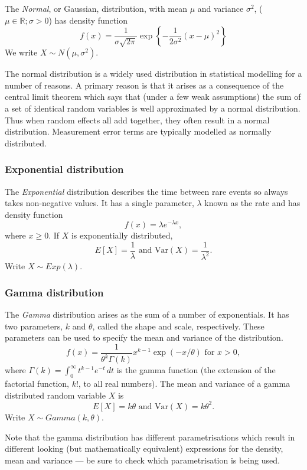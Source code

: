 \documentclass[11pt]{article}
\begin{document}
 
The {\em Normal}, or Gaussian, distribution, with mean $\mu$ and variance $\sigma^2$, ($\mu\in\mathbb{R};\sigma>0$) has density function 
\[
f(x)=\frac{1}{\sigma\sqrt{2\pi}}\exp\left\{-\frac{1}{2\sigma^2}\left(x-\mu\right)^2\right\}
\]
We write  $X \sim N(\mu,\sigma^2)$.

The normal distribution is a widely used distribution in statistical modelling  for  a number of reasons.  A primary reason is that it arises as a consequence of the central limit theorem which says that (under a few weak assumptions) the sum of a set of identical  random variables is well approximated by a normal distribution. Thus when random effects all add together, they often result in a normal distribution.  Measurement error terms are typically modelled as normally distributed.
 
 \subsubsection{Exponential  distribution}

The  {\em Exponential} distribution describes the time between rare events so always takes non-negative values.  It has a single parameter, $\lambda$ known as the rate and has density function \[f(x) = \lambda e^{-\lambda x},\] where $x \geq 0$.
 If $X$ is exponentially distributed, 
 \[ E[X] = \frac 1 \lambda \mbox{ and } \mathrm{Var}(X) = \frac 1 {\lambda^2}. \]
 Write $X \sim Exp(\lambda)$.
 
 \subsubsection{Gamma distribution}

 The {\em Gamma} distribution arises as the sum of a number of exponentials.  It has two parameters, $k$ and $\theta$, called the shape and scale, respectively. These parameters can be used to specify the  mean and variance of the distribution.
 \[ f(x)=\frac{1}{\theta^k\Gamma(k)}x^{k-1}\exp(-x/\theta) \mbox{ for } x>0, \]
 where $\Gamma(k) = \int_0^\infty t^{k - 1}e^{-t} \, dt$ is the gamma function (the extension of the factorial function, $k !$, to all real numbers).  
The mean and variance of a gamma distributed random variable $X$ is 
\[ E[X] =  k\theta \mbox{ and } \mathrm{Var}(X) = k\theta^2.\]
 Write $X \sim Gamma(k,\theta).$

Note that the gamma distribution has different parametrisations which result in different looking (but mathematically equivalent) expressions for the density, mean and variance ---  be sure to check which parametrisation  is being used.
 
\end{document}
